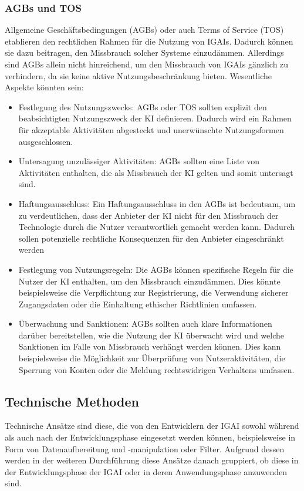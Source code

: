 \documentclass[12pt]{article}
\begin{document}
\subsubsection{AGBs und TOS}
Allgemeine Geschäftsbedingungen (AGBs) oder auch Terms of Service (TOS) etablieren den rechtlichen Rahmen für die Nutzung von IGAIs. Dadurch können sie dazu beitragen, den Missbrauch solcher Systeme einzudämmen. 
Allerdings sind AGBs allein nicht hinreichend, um den Missbrauch von IGAIs gänzlich zu verhindern, da sie keine aktive Nutzungsbeschränkung bieten. Wesentliche Aspekte könnten sein:
\begin{itemize}
    \item Festlegung des Nutzungszwecks: AGBs oder TOS sollten explizit den beabsichtigten Nutzungszweck der KI definieren. Dadurch wird ein Rahmen für akzeptable Aktivitäten abgesteckt und unerwünschte Nutzungsformen ausgeschlossen.
    \item Untersagung unzulässiger Aktivitäten: AGBs sollten eine Liste von Aktivitäten enthalten, die als Missbrauch der KI gelten und somit untersagt sind.
    \item Haftungsausschluss: Ein Haftungsausschluss in den AGBs ist bedeutsam, um zu verdeutlichen, dass der Anbieter der KI nicht für den Missbrauch der Technologie durch die Nutzer verantwortlich gemacht werden kann. Dadurch sollen potenzielle rechtliche Konsequenzen für den Anbieter eingeschränkt werden
    \item Festlegung von Nutzungsregeln: Die AGBs  können spezifische Regeln für die Nutzer der KI enthalten, um den Missbrauch einzudämmen. Dies könnte beispielsweise die Verpflichtung zur Registrierung, die Verwendung sicherer Zugangsdaten oder die Einhaltung ethischer Richtlinien umfassen.
    \item Überwachung und Sanktionen: AGBs sollten auch klare Informationen darüber bereitstellen, wie die Nutzung der KI überwacht wird und welche Sanktionen im Falle von Missbrauch verhängt werden können. Dies kann beispielsweise die Möglichkeit zur Überprüfung von Nutzeraktivitäten, die Sperrung von Konten oder die Meldung rechtswidrigen Verhaltens umfassen.
\end{itemize}
\subsection{Technische Methoden}
Technische Ansätze sind diese, die von den Entwicklern der IGAI sowohl während als auch nach der Entwicklungsphase eingesetzt werden können, beispielsweise in Form von Datenaufbereitung und -manipulation oder Filter. 
Aufgrund dessen werden in der weiteren Durchführung diese Ansätze danach gruppiert, ob diese in der Entwicklungsphase der IGAI oder in deren Anwendungsphase anzuwenden sind.
\end{document}
